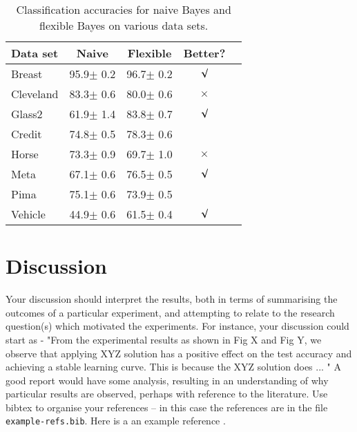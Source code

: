 \documentclass{article}
\begin{document}
\begin{table}[tb]
\vskip 3mm
\begin{center}
\begin{small}
\begin{sc}
\begin{tabular}{lcccr}
\hline
\abovespace\belowspace
Data set & Naive & Flexible & Better? \\
\hline
\abovespace
Breast    & 95.9$\pm$ 0.2& 96.7$\pm$ 0.2& $\surd$ \\
Cleveland & 83.3$\pm$ 0.6& 80.0$\pm$ 0.6& $\times$\\
Glass2    & 61.9$\pm$ 1.4& 83.8$\pm$ 0.7& $\surd$ \\
Credit    & 74.8$\pm$ 0.5& 78.3$\pm$ 0.6&         \\
Horse     & 73.3$\pm$ 0.9& 69.7$\pm$ 1.0& $\times$\\
Meta      & 67.1$\pm$ 0.6& 76.5$\pm$ 0.5& $\surd$ \\
Pima      & 75.1$\pm$ 0.6& 73.9$\pm$ 0.5&         \\
\belowspace
Vehicle   & 44.9$\pm$ 0.6& 61.5$\pm$ 0.4& $\surd$ \\
\hline
\end{tabular}
\end{sc}
\end{small}
\caption{Classification accuracies for naive Bayes and flexible 
Bayes on various data sets.}
\label{tab:sample-table}
\end{center}
\vskip -3mm
\end{table}



\section{Discussion}
Your discussion should interpret the results, both in terms of summarising the outcomes of a particular experiment, and attempting to relate to the research question(s) which motivated the experiments. For instance, your discussion could start as - "From the experimental results as shown in Fig X and Fig Y, we observe that applying XYZ solution has a positive effect on the test accuracy and achieving a stable learning curve. This is because the XYZ solution does ... " A good report would have some analysis, resulting in an understanding of why particular results are observed, perhaps with reference to the literature. Use bibtex to organise your references -- in this case the references are in the file \verb+example-refs.bib+.  Here is a an example reference \citep{langley00}.  
\end{document}
